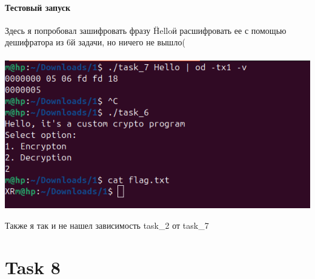     \paragraph{Тестовый запуск}
    Здесь я попробовал зашифровать фразу \"Hello\" и расшифровать ее с помощью дешифратора из 6й задачи, но ничего
    не вышло(
    \paragraph{}
    \includegraphics{static/_task_7.png}

    Также я так и не нашел зависимость task\_2 от task\_7

    \section*{Task 8}



